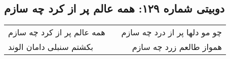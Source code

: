 \begin{center}
\section*{دوبیتی شماره ۱۲۹: همه عالم پر از کرد چه سازم}
\label{sec:129}
\begin{longtable}{l p{0.5cm} r}
همه عالم پر از کرد چه سازم
&&
چو مو دلها پر از درد چه سازم
\\
بکشتم سنبلی دامان الوند
&&
همواز طالعم زرد چه سازم
\\
\end{longtable}
\end{center}
